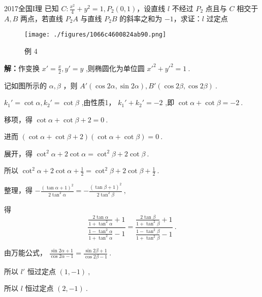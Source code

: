 \begin{example}{2017全国I理}
已知 $\displaystyle{C:\frac{x^2}4+y^2=1,P_2(0,1)}$，设直线 $\displaystyle{l}$ 不经过 $\displaystyle{P_2}$ 点且与 $\displaystyle{C}$ 相交于 $\displaystyle{A,B}$ 两点，若直线 $\displaystyle{P_2A}$ 与直线 $\displaystyle{P_2B}$ 的斜率之和为 $\displaystyle{-1}$，求证：$\displaystyle{l}$ 过定点
\begin{figure}[ht]
\centering
\texttt{[image: ./figures/1066c4600824ab90.png]}
\caption{例 4} \label{fig_affine_11}
\end{figure}
\textbf{解：}作变换 $\displaystyle{x'=\frac{x}{2},y'=y}$ ,则椭圆化为单位圆 $\displaystyle{x'^2+y'^2=1}~.$

记如图所示的 $\displaystyle{\alpha,\beta}$ ，则 $\displaystyle{A'(\cos2\alpha,\sin2\alpha),B'(\cos2\beta,\cos2\beta)}~.$

$\displaystyle{k_1'=\cot{\alpha},k_2'=\cot{\beta}}$ ,由性质1， $\displaystyle{k_1'+k_2'=-2}$ ,即 $\displaystyle{\cot{\alpha}+\cot{\beta}=-2}~.$

移项，得 $\displaystyle{\cot\alpha+\cot \beta+2=0}~.$

进而 $\displaystyle{(\cot\alpha+\cot \beta+2)(\cot \alpha+\cot\beta)=0}~.$

展开，得 $\displaystyle{\cot^2\alpha+2\cot\alpha=\cot^2\beta+2\cot\beta}~.$

所以 $\displaystyle{\cot^2\alpha+2\cot\alpha+\frac{1}{2}=\cot^2\beta+2\cot\beta+\frac{1}{2}}~.$

整理，得 $\displaystyle{-\frac{(\tan\alpha+1)^2}{2\tan^2\alpha}=-\frac{(\tan\beta+1)^2}{2\tan^2\beta}}~,$

得 
$$\frac{\frac{2\tan\alpha}{1+\tan^2\alpha}+1}{\frac{1-\tan^2\alpha}{1+\tan^2\alpha}-1}=\frac{\frac{2\tan\beta}{1+\tan^2\beta}+1}{\frac{1-\tan^2\beta}{1+\tan^2\beta}-1}~.$$

由万能公式， $\displaystyle{\frac{\sin2\alpha+1}{\cos2\alpha-1}=\frac{\sin2\beta+1}{\cos2\beta-1}}~.$

所以 $\displaystyle{l'}$ 恒过定点 $\displaystyle{(1,-1)}~,$

所以 $\displaystyle{l}$ 恒过定点 $\displaystyle{(2,-1)}~.$ 
\end{example}
